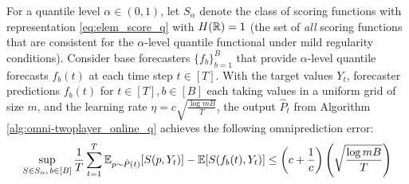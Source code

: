 \begin{theorem} \label{thm:omni-twoplayer_online_q}
  For a quantile level $\alpha \in (0,1)$, let $S_\alpha$ denote the class of scoring functions with representation \eqref{eq:elem_score_q} with $H(\mathbb{R}) = 1$ (the set of \textit{all} scoring functions that are consistent for the $\alpha$-level quantile functional under mild regularity conditions). Consider base forecasters $\{f_b\}_{b=1}^B$ that provide $\alpha$-level quantile forecasts $f_b(t)$ at each time step $t \in [T]$. With the target values $Y_t$, forecaster predictions $f_b(t)$ for $t \in [T], b \in [B]$ each taking values in a uniform grid of size $m$, and the learning rate $\eta = c\sqrt{\frac{\log mB}{T}}$, the output $\hat{P}_t$ from Algorithm \ref{alg:omni-twoplayer_online_q} achieves the following omniprediction error:
  \begin{align*}
  \sup_{S \in S_\alpha,\, b \in [B]} \frac{1}{T} \sum_{t=1}^T \mathbb{E}_{p \sim \hat{P}(t)} [S(p, Y_t)] - \mathbb{E}[S(f_b(t), Y_t)]
  \leq \left(c+\frac{1}{c}\right)\left(\sqrt{\frac{\log mB}{T}}\right)
  \end{align*}
\end{theorem}

